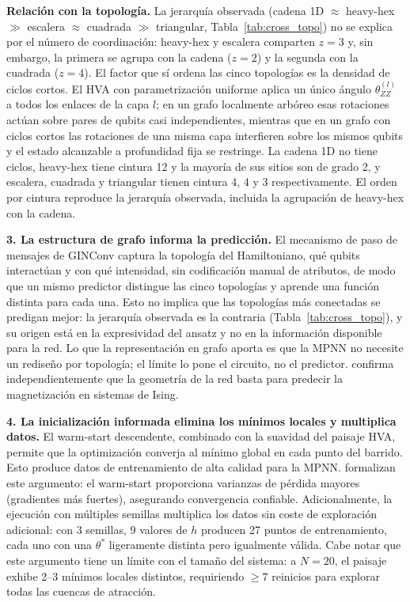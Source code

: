 \documentclass[11pt,a4paper,spanish]{book}
\begin{document}
\textbf{Relación con la topología.} La jerarquía observada (cadena 1D $\approx$ heavy-hex $\gg$ escalera $\approx$ cuadrada $\gg$ triangular, Tabla~\ref{tab:cross_topo}) no se explica por el número de coordinación: heavy-hex y escalera comparten $z = 3$ y, sin embargo, la primera se agrupa con la cadena ($z = 2$) y la segunda con la cuadrada ($z = 4$). El factor que sí ordena las cinco topologías es la densidad de ciclos cortos. El HVA con parametrización uniforme aplica un único ángulo $\theta_{ZZ}^{(l)}$ a todos los enlaces de la capa $l$; en un grafo localmente arbóreo esas rotaciones actúan sobre pares de qubits casi independientes, mientras que en un grafo con ciclos cortos las rotaciones de una misma capa interfieren sobre los mismos qubits y el estado alcanzable a profundidad fija se restringe. La cadena 1D no tiene ciclos, heavy-hex tiene cintura 12 y la mayoría de sus sitios son de grado 2, y escalera, cuadrada y triangular tienen cintura 4, 4 y 3 respectivamente. El orden por cintura reproduce la jerarquía observada, incluida la agrupación de heavy-hex con la cadena.

\textbf{3. La estructura de grafo informa la predicción.} El mecanismo de paso de mensajes de GINConv captura la topología del Hamiltoniano, qué qubits interactúan y con qué intensidad, sin codificación manual de atributos, de modo que un mismo predictor distingue las cinco topologías y aprende una función distinta para cada una. Esto no implica que las topologías más conectadas se predigan mejor: la jerarquía observada es la contraria (Tabla~\ref{tab:cross_topo}), y su origen está en la expresividad del ansatz y no en la información disponible para la red. Lo que la representación en grafo aporta es que la MPNN no necesite un rediseño por topología; el límite lo pone el circuito, no el predictor. \citet{slavin2025} confirma independientemente que la geometría de la red basta para predecir la magnetización en sistemas de Ising.

\textbf{4. La inicialización informada elimina los mínimos locales y multiplica datos.} El warm-start descendente, combinado con la suavidad del paisaje HVA, permite que la optimización converja al mínimo global en cada punto del barrido. Esto produce datos de entrenamiento de alta calidad para la MPNN. \citet{puig2025} formalizan este argumento: el warm-start proporciona varianzas de pérdida mayores (gradientes más fuertes), asegurando convergencia confiable. Adicionalmente, la ejecución con múltiples semillas multiplica los datos sin coste de exploración adicional: con 3 semillas, 9 valores de $h$ producen 27 puntos de entrenamiento, cada uno con una $\theta^*$ ligeramente distinta pero igualmente válida. Cabe notar que este argumento tiene un límite con el tamaño del sistema: a $N = 20$, el paisaje exhibe 2--3 mínimos locales distintos, requiriendo $\geq 7$ reinicios para explorar todas las cuencas de atracción.
\end{document}
